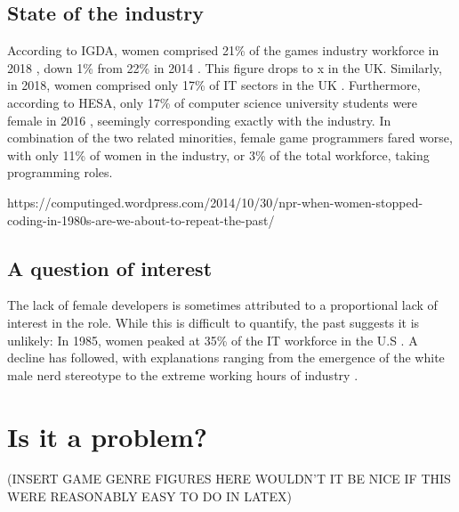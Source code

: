 \documentclass{scrartcl}
\begin{document}
\subsection{State of the industry}
According to IGDA, women comprised 21\% of the games industry workforce in 2018 \cite{igda_satisfaction_2017}, down 1\% from 22\% in 2014 \cite{igda_satisfaction_2014}. This figure drops to x in the UK. Similarly, in 2018, women comprised only 17\% of IT sectors in the UK \cite{uk_employees_2018}. Furthermore, according to HESA, only 17\% of computer science university students were female in 2016 \cite{hesa_2016}, seemingly corresponding exactly with the industry. In combination of the two related minorities, female game programmers fared worse, with only 11\% \cite{igda_diversity_2016} of women in the industry, or 3\% of the total workforce, taking programming roles.

https://computinged.wordpress.com/2014/10/30/npr-when-women-stopped-coding-in-1980s-are-we-about-to-repeat-the-past/

\subsection{A question of interest}
The lack of female developers is sometimes attributed to a proportional lack of interest in the role. While this is difficult to quantify, the past suggests it is unlikely: In 1985, women peaked at 35\% of the IT workforce in the U.S \cite{vogel_spitting_2017}. A decline has followed, with explanations ranging from the emergence of the white male nerd stereotype \cite{vogel_spitting_2017} to the extreme working hours of industry \cite{allan_fair_2017}.


\section{Is it a problem?}
(INSERT GAME GENRE FIGURES HERE WOULDN'T IT BE NICE IF THIS WERE REASONABLY EASY TO DO IN LATEX)
\end{document}
